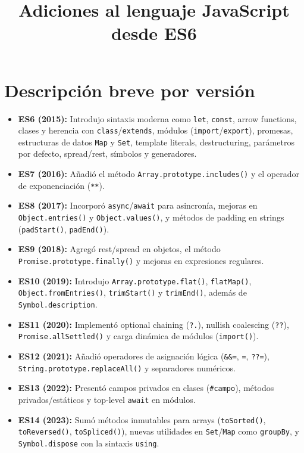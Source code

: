 \documentclass[12pt]{article}
\begin{document}
\title{Adiciones al lenguaje JavaScript desde ES6}
\author{}
\date{}
\maketitle

\section*{Descripción breve por versión}

\begin{itemize}
  \item \textbf{ES6 (2015):} Introdujo sintaxis moderna como \texttt{let}, \texttt{const}, arrow functions, clases y herencia con \texttt{class}/\texttt{extends}, módulos (\texttt{import}/\texttt{export}), promesas, estructuras de datos \texttt{Map} y \texttt{Set}, template literals, destructuring, parámetros por defecto, spread/rest, símbolos y generadores.
  \item \textbf{ES7 (2016):} Añadió el método \texttt{Array.prototype.includes()} y el operador de exponenciación (\texttt{**}).
  \item \textbf{ES8 (2017):} Incorporó \texttt{async}/\texttt{await} para asincronía, mejoras en \texttt{Object.entries()} y \texttt{Object.values()}, y métodos de padding en strings (\texttt{padStart()}, \texttt{padEnd()}).
  \item \textbf{ES9 (2018):} Agregó rest/spread en objetos, el método \texttt{Promise.prototype.finally()} y mejoras en expresiones regulares.
  \item \textbf{ES10 (2019):} Introdujo \texttt{Array.prototype.flat()}, \texttt{flatMap()}, \texttt{Object.fromEntries()}, \texttt{trimStart()} y \texttt{trimEnd()}, además de \texttt{Symbol.description}.
  \item \textbf{ES11 (2020):} Implementó optional chaining (\texttt{?.}), nullish coalescing (\texttt{??}), \texttt{Promise.\allowbreak allSettled()} y carga dinámica de módulos (\texttt{import()}).
  \item \textbf{ES12 (2021):} Añadió operadores de asignación lógica (\texttt{\&\&=}, \texttt{\textbar\textbar=}, \texttt{??=}), \texttt{String.prototype.replaceAll()} y separadores numéricos.
  \item \textbf{ES13 (2022):} Presentó campos privados en clases (\texttt{\#campo}), métodos privados/estáticos y top-level \texttt{await} en módulos.
  \item \textbf{ES14 (2023):} Sumó métodos inmutables para arrays (\texttt{toSorted()}, \texttt{toReversed()}, \texttt{toSpliced()}), nuevas utilidades en \texttt{Set}/\texttt{Map} como \texttt{groupBy}, y \texttt{Symbol.dispose} con la sintaxis \texttt{using}.
\end{itemize}
\end{document}
